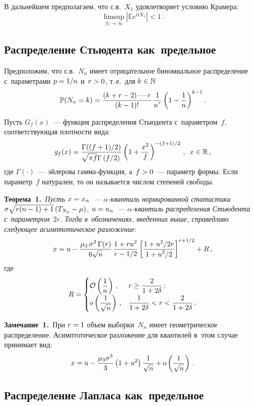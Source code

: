 \begin{multicols}{2}
В дальнейшем предполагаем, что с.в.~$X_1$ удовле\-тво\-ря\-ет условию Крамера:
$$
\limsup\limits_{|t|\rightarrow \infty}\left|\mathbb{E} e^{itX_1}\right|<1\,.
$$

\subsection{Распределение Стьюдента как~предельное}

Предположим, что с.в.~$N_n$ имеет отрицательное биномиальное распределение 
с~параметрами $p\hm=1/n$ и~$r\hm>0$, т.\,е.\ для $k \hm\in \mathbb{N}$
$$
\mathbb{P}(N_n=k)=\fr{\left(k+r-2\right)\cdots r}{(k-1)!}\,
\fr{1}{n^{r}}\left(1-\fr{1}{n}\right)^{k-1}.
$$

Пусть $G_f (x)$~--- функция распределения   Стьюдента с~параметром~$f$, 
соответствующая плотности вида:
$$
g_f (x)=\fr{\Gamma((f+1)/2)}{\sqrt{\pi f} \Gamma\left(f/2\right)} 
\left(1+\fr{x^{2}}{f}\right)^{-(f+1)/2}\,,\enskip x \in \mathbb{R}\,,
$$
где $\Gamma(\cdot)$~--- эйлерова гам\-ма-функ\-ция, а~$f\hm>0$~--- параметр
формы. Если параметр~$f$ натурален, то он называется числом степеней свободы.

\smallskip

\noindent
\textbf{Теорема~1.}\ 
\textit{Пусть $x\hm=x_\alpha$~--- $\alpha$-кван\-тиль 
нормированной статистики $\sigma \sqrt{r(n-1)+1}\left(T_{N_n}\hm-\mu\right)$,
$u\hm=u_\alpha$~--- $\alpha$-кван\-тиль распределения Стьюдента с~параметром~$2r$.
Тогда в~обозначениях, введенных выше, справедливо следующее асимптотическое разложение}:
$$
x = u-\fr{\mu_3\, \sigma^{3}\, \Gamma(r)}
{6\sqrt{n}}\, \fr{1+ru^{2}}{r-1/2} \left[
\fr{1+u^{2}/2r}{1+u^{2}/2}\right]^{r+1/2}+R\,,
$$
где 
$$
R =  \begin{cases}     
\mathcal{O}\left(\fr{1}{n}\right)\,, & r\ge \fr{2}{1+2\delta}\,; \\
   o\left(\fr{1}{\sqrt{n}}\right) \,, & \fr{1}{1+2\delta}<r<\fr{2}{1+2\delta}\,.
            \end{cases}
            $$

\noindent
\textbf{Замечание~1.}\
При $r\hm=1$ объем выборки~$N_n$ имеет геометрическое распределение. 
Асимптотическое разложение для квантилей в~этом случае принимает вид:
$$
x  = u-\fr{\mu_3 \sigma^{3}}{3}\left( 
1+u^{2}\right)\fr{1}{\sqrt{n}}+o\left(\fr{1}{\sqrt{n}}\right)\,.
$$


\subsection{Распределение Лапласа как~предельное}


\end{multicols}
